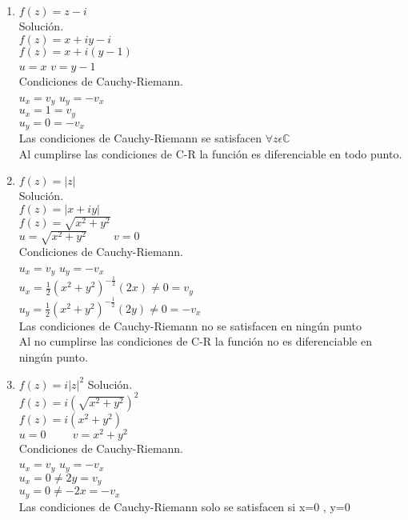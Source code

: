 \documentclass[12pt,letterpaper]{article}
\begin{document}
\begin{enumerate}
\item $f(z)= z-i$ \\
Soluci\'on.\\
$f(z)=x+iy-i$\\
$f(z)=x+i(y-1)$\\
$u=x$ \hspace{1cm} $v=y-1$\\
Condiciones de Cauchy-Riemann.\\
$u_x=v_y$ \hspace{1cm} $u_y=-v_x$\\
$u_x=1=v_y$\\
$u_y=0=-v_x$\\
Las condiciones de Cauchy-Riemann se satisfacen $\forall z \epsilon \mathbb{C}$\\
Al cumplirse las condiciones de C-R la funci\'on es diferenciable en todo punto.
\item $f(z)= |z|$\\
Soluci\'on.\\
$f(z)=|x+iy|$\\
$f(z)=\sqrt{x^2+y^2}$\\
$u=\sqrt{x^2+y^2} \hspace{1cm} v=0$\\
Condiciones de Cauchy-Riemann.\\
$u_x=v_y$ \hspace{1cm} $u_y=-v_x$\\
$u_x=\frac{1}{2}(x^2+y^2)^{-\frac{1}{2}}(2x)\neq 0=v_y$\\
$u_y=\frac{1}{2}(x^2+y^2)^{-\frac{1}{2}}(2y)\neq 0=-v_x$\\
Las condiciones de Cauchy-Riemann no se satisfacen en ning\'un punto\\
Al no cumplirse las condiciones de C-R la funci\'on no es diferenciable en ning\'un punto.
\item $f(z)= i|z|^2$
Soluci\'on.\\
$f(z)=i(\sqrt{x^2+y^2})^2$\\
$f(z)=i(x^2+y^2)$\\
$u=0 \hspace{1cm} v=x^2+y^2$\\
Condiciones de Cauchy-Riemann.\\
$u_x=v_y$ \hspace{1cm} $u_y=-v_x$\\
$u_x = 0 \neq 2y = v_y$\\
$u_y = 0 \neq -2x =-v_x$\\
Las condiciones de Cauchy-Riemann solo se satisfacen si x=0 , y=0 \\

\end{enumerate}
\end{document}
